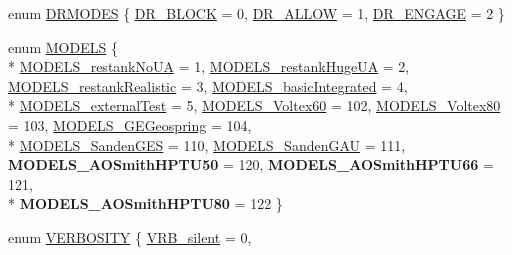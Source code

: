 \begin{DoxyCompactItemize}
\item 
enum \hyperlink{class_h_p_w_h_a6a74814715ed6a33a75fd0d9dc3e7107}{D\-R\-M\-O\-D\-E\-S} \{ \hyperlink{class_h_p_w_h_a6a74814715ed6a33a75fd0d9dc3e7107acb6ede5bfedbd26d1e1021c1dfeaaea8}{D\-R\-\_\-\-B\-L\-O\-C\-K} = 0, 
\hyperlink{class_h_p_w_h_a6a74814715ed6a33a75fd0d9dc3e7107a3ad0a53f7db054449c523c96107a820a}{D\-R\-\_\-\-A\-L\-L\-O\-W} = 1, 
\hyperlink{class_h_p_w_h_a6a74814715ed6a33a75fd0d9dc3e7107ac7a7e433da8920f98289ecd6b3246a6a}{D\-R\-\_\-\-E\-N\-G\-A\-G\-E} = 2
 \}
\item 
enum \hyperlink{class_h_p_w_h_acf117eb928a21b7b757b653455a2338e}{M\-O\-D\-E\-L\-S} \{ \\*
\hyperlink{class_h_p_w_h_acf117eb928a21b7b757b653455a2338ea62c7e326af23defb19fbf487a2c9d1f6}{M\-O\-D\-E\-L\-S\-\_\-restank\-No\-U\-A} = 1, 
\hyperlink{class_h_p_w_h_acf117eb928a21b7b757b653455a2338ea123ddb8a029374e30a61fda34289f851}{M\-O\-D\-E\-L\-S\-\_\-restank\-Huge\-U\-A} = 2, 
\hyperlink{class_h_p_w_h_acf117eb928a21b7b757b653455a2338eae274d4cc32d2834dedd0705018e41c41}{M\-O\-D\-E\-L\-S\-\_\-restank\-Realistic} = 3, 
\hyperlink{class_h_p_w_h_acf117eb928a21b7b757b653455a2338eade72adc9496641aeb59b201b71cbb41c}{M\-O\-D\-E\-L\-S\-\_\-basic\-Integrated} = 4, 
\\*
\hyperlink{class_h_p_w_h_acf117eb928a21b7b757b653455a2338ea0f6ca73826370b770293feb6b39b0035}{M\-O\-D\-E\-L\-S\-\_\-external\-Test} = 5, 
\hyperlink{class_h_p_w_h_acf117eb928a21b7b757b653455a2338eae13103789d0bd6c0aaea887bcadc3e3c}{M\-O\-D\-E\-L\-S\-\_\-\-Voltex60} = 102, 
\hyperlink{class_h_p_w_h_acf117eb928a21b7b757b653455a2338ea43a81e504a36439014268afec64a899d}{M\-O\-D\-E\-L\-S\-\_\-\-Voltex80} = 103, 
\hyperlink{class_h_p_w_h_acf117eb928a21b7b757b653455a2338ea6db9981f52f9360905b8bbc8cd13e2bd}{M\-O\-D\-E\-L\-S\-\_\-\-G\-E\-Geospring} = 104, 
\\*
\hyperlink{class_h_p_w_h_acf117eb928a21b7b757b653455a2338eaa4e8a7fab0f9aaec663b88b84f81db22}{M\-O\-D\-E\-L\-S\-\_\-\-Sanden\-G\-E\-S} = 110, 
\hyperlink{class_h_p_w_h_acf117eb928a21b7b757b653455a2338eac87d8fbe2c7a407b3e1306e0342dd8a1}{M\-O\-D\-E\-L\-S\-\_\-\-Sanden\-G\-A\-U} = 111, 
{\bfseries M\-O\-D\-E\-L\-S\-\_\-\-A\-O\-Smith\-H\-P\-T\-U50} = 120, 
{\bfseries M\-O\-D\-E\-L\-S\-\_\-\-A\-O\-Smith\-H\-P\-T\-U66} = 121, 
\\*
{\bfseries M\-O\-D\-E\-L\-S\-\_\-\-A\-O\-Smith\-H\-P\-T\-U80} = 122
 \}
\item 
enum \hyperlink{class_h_p_w_h_aa493e3f78affa7dafde7e297cc68673c}{V\-E\-R\-B\-O\-S\-I\-T\-Y} \{ \hyperlink{class_h_p_w_h_aa493e3f78affa7dafde7e297cc68673ca2883a012f3515137cba205b5de85f951}{V\-R\-B\-\_\-silent} = 0, 

\end{DoxyCompactItemize}
